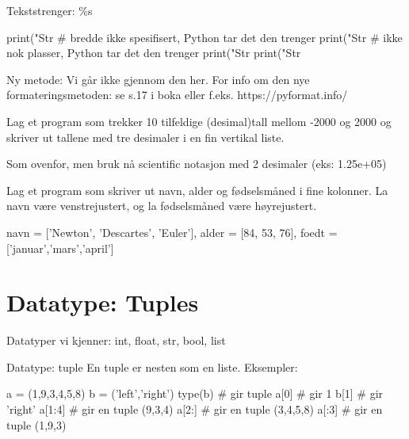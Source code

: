 Tekststrenger: \%s

\begin{usncodebox}
print("Str %
                                  # bredde ikke spesifisert, Python tar det den trenger
print("Str %
                                  # ikke nok plasser, Python tar det den trenger
print("Str %
print("Str %
\end{usncodebox}

Ny metode:
Vi går ikke gjennom den her. For info om den nye formateringsmetoden: se s.17 i boka eller f.eks. https://pyformat.info/

\begin{exercise}
Lag et program som trekker 10 tilfeldige (desimal)tall mellom -2000 og 2000 og skriver ut tallene med tre desimaler i en fin vertikal liste.
\end{exercise}

\begin{exercise}
Som ovenfor, men bruk nå scientific notasjon med 2 desimaler (eks: 1.25e+05)
\end{exercise}

\begin{exercise}
Lag et program som skriver ut navn, alder og fødselsmåned i fine kolonner. La navn være venstrejustert, og la fødselsmåned være høyrejustert.
\end{exercise}
\begin{usncodebox}
navn = ['Newton', 'Descartes', 'Euler'], alder = [84, 53, 76], 
foedt = ['januar','mars','april']
\end{usncodebox}

\section{Datatype: Tuples}

Datatyper vi kjenner: int, float, str, bool, list 

Datatype: tuple
En tuple er nesten som en liste.
Eksempler: 
\begin{usncodebox}
a = (1,9,3,4,5,8)
b = ('left','right')
type(b)    # gir tuple
a[0]       # gir 1 
b[1]       # gir 'right'
a[1:4]     # gir en tuple (9,3,4)
a[2:]      # gir en tuple (3,4,5,8)
a[:3]      # gir en tuple (1,9,3)
\end{usncodebox}

